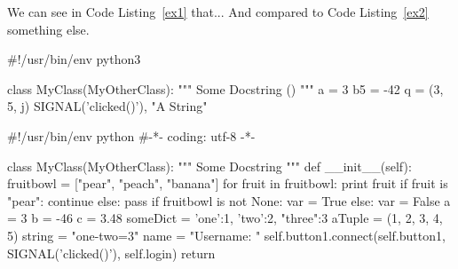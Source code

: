 \documentclass{article}
\begin{document}
We can see in Code Listing~\ref{ex1} that... And compared to Code Listing~\ref{ex2} something else.

\begin{python}[moreemph={[4]42},caption={Simple python example No. 1},label=ex1]
#!/usr/bin/env python3

class MyClass(MyOtherClass):
  """
  Some Docstring ()
  """
  a = 3
  b5 = -42
  q = (3, 5, j)
  SIGNAL('clicked()'),
  "A String"
\end{python}

\begin{python}[moreemph={[4], 46, 48},caption={Simple python example No. 2},label=ex2]
#!/usr/bin/env python 
#-*- coding: utf-8 -*- 
 
class MyClass(MyOtherClass):
  """ 
  Some Docstring 
  """ 
  def __init__(self):
    fruitbowl = ["pear", "peach", "banana"]
    for fruit in fruitbowl:
      print fruit
      if fruit is "pear":
        continue
      else:
        pass
    if fruitbowl is not None:
      var = True
    else:
      var = False
    a = 3
    b = -46
    c = 3.48
    someDict = {'one':1, 'two':2, "three":3}
    aTuple = (1, 2, 3, 4, 5)
    string = "one-two=3"
    name = "Username: "
    self.button1.connect(self.button1,
        SIGNAL('clicked()'),
        self.login)
    return
\end{python}

\lstlistoflistings
\end{document}
